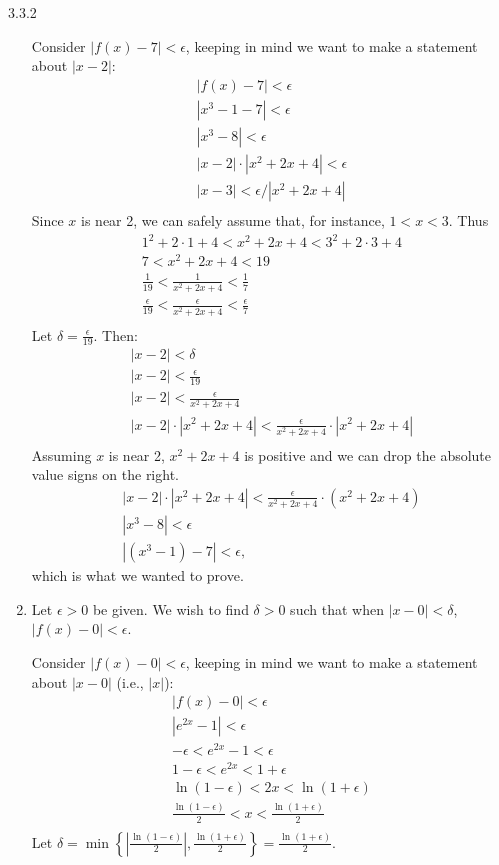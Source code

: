 \begin{Answer}{3.3.2}
\begin{enumerate}
{Consider $|f(x)-7|<\epsilon$, keeping in  mind we want to make a statement about $|x-2|$:
\begin{gather*}
|f(x) -7 | < \epsilon \\
|x^3-1 -7 |<\epsilon \\
| x^3-8 | < \epsilon \\
| x-2 |\cdot|x^2+2x+4| < \epsilon \\
| x-3 | < \epsilon/|x^2+2x+4| \\
\end{gather*}
Since $x$ is near 2, we can safely assume that, for instance, $1<x<3$. Thus
\begin{gather*}
1^2+2\cdot1+4<x^2+2x+4<3^2+2\cdot3+4 \\
7 < x^2+2x+4 < 19 \\
\frac{1}{19} < \frac{1}{x^2+2x+4} < \frac{1}{7} \\
\frac{\epsilon}{19} < \frac{\epsilon}{x^2+2x+4} < \frac{\epsilon}{7} \\
\end{gather*}
Let $\delta =\frac{\epsilon}{19}$. Then:
\begin{gather*}
|x-2|<\delta \\
|x-2| < \frac{\epsilon}{19}\\
|x-2| < \frac{\epsilon}{x^2+2x+4}\\
|x-2|\cdot|x^2+2x+4| < \frac{\epsilon}{x^2+2x+4}\cdot|x^2+2x+4|\\
\end{gather*}
Assuming $x$ is near 2, $x^2+2x+4$ is positive and we can drop the absolute value signs on the right.
\begin{gather*}
|x-2|\cdot|x^2+2x+4| < \frac{\epsilon}{x^2+2x+4}\cdot(x^2+2x+4)\\
|x^3-8| < \epsilon\\
|(x^3-1) - 7| < \epsilon,
\end{gather*}
which is what we wanted to prove.
}
\item {Let $\epsilon >0$ be given. We wish to find $\delta >0$ such that when $|x-0|<\delta$, $|f(x)-0|<\epsilon$.

Consider $|f(x)-0|<\epsilon$, keeping in  mind we want to make a statement about $|x-0|$ (i.e., $|x|$):
\begin{gather*}
|f(x) -0 | < \epsilon \\
|e^{2x}-1 |<\epsilon \\
-\epsilon< e^{2x}-1 < \epsilon \\
1-\epsilon< e^{2x} < 1+\epsilon \\
\ln (1-\epsilon) < 2x < \ln (1+\epsilon) \\
\frac{\ln (1-\epsilon)}{2} < x < \frac{\ln (1+\epsilon)}{2} \\
\end{gather*}
Let $\delta = \min\left\{\left|\frac{\ln(1-\epsilon)}{2}\right|,\frac{\ln(1+\epsilon)}{2}\right\}=\frac{\ln(1+\epsilon)}{2}.$

}
\end{enumerate}
\end{Answer}
